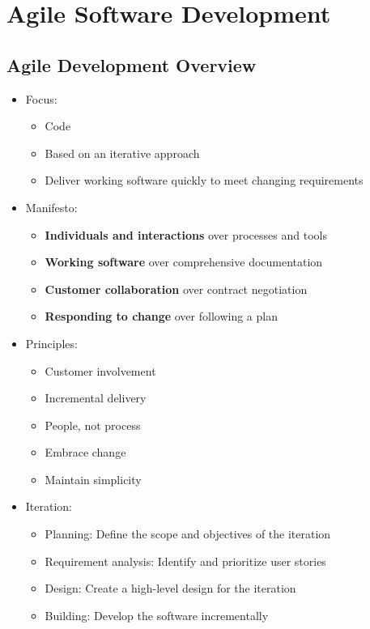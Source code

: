 \documentclass[12pt,openany]{book}
\begin{document}
\chapter{Agile Software Development}
\section{Agile Development Overview}
\begin{itemize}
    \item Focus:
    \begin{itemize}
        \item Code
        \item Based on an iterative approach
        \item Deliver working software quickly to meet changing requirements
    \end{itemize}
    \item Manifesto:
    \begin{itemize}
        \item \textbf{Individuals and interactions} over processes and tools
        \item \textbf{Working software} over comprehensive documentation
        \item \textbf{Customer collaboration} over contract negotiation
        \item \textbf{Responding to change} over following a plan
    \end{itemize}
    \item Principles:
    \begin{itemize}
        \item Customer involvement
        \item Incremental delivery
        \item People, not process
        \item Embrace change
        \item Maintain simplicity
    \end{itemize}
    \item Iteration:
    \begin{itemize}
        \item Planning: Define the scope and objectives of the iteration
        \item Requirement analysis: Identify and prioritize user stories
        \item Design: Create a high-level design for the iteration
        \item Building: Develop the software incrementally

\end{itemize}
\end{itemize}
\end{document}
